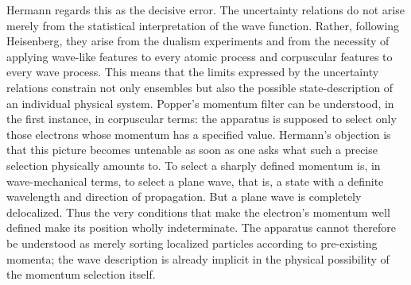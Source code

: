 %
%
%

Hermann regards this as the decisive error. The uncertainty relations do not arise merely from the statistical interpretation of the wave function. Rather, following Heisenberg, they arise from the dualism experiments and from the necessity of applying wave-like features to every atomic process and corpuscular features to every wave process. This means that the limits expressed by the uncertainty relations constrain not only ensembles but also the possible state-description of an individual physical system. Popper’s momentum filter can be understood, in the first instance, in corpuscular terms: the apparatus is supposed to select only those electrons whose momentum has a specified value. Hermann’s objection is that this picture becomes untenable as soon as one asks what such a precise selection physically amounts to. To select a sharply defined momentum is, in wave-mechanical terms, to select a plane wave, that is, a state with a definite wavelength and direction of propagation. But a plane wave is completely delocalized. Thus the very conditions that make the electron’s momentum well defined make its position wholly indeterminate. The apparatus cannot therefore be understood as merely sorting localized particles according to pre-existing momenta; the wave description is already implicit in the physical possibility of the momentum selection itself.

